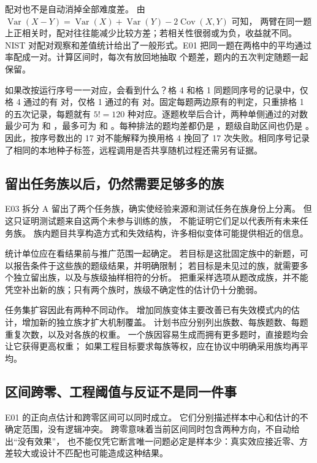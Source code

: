 配对也不是自动消掉全部难度差。
由 $\operatorname{Var}(X-Y)=\operatorname{Var}(X)+\operatorname{Var}(Y)-2\operatorname{Cov}(X,Y)$ 可知，
两臂在同一题上正相关时，配对往往能减少比较方差；若相关性很弱或为负，收益就不同。
NIST 对配对观察和差值统计给出了一般形式\cite{nist-paired}。E01 把同一题在两格中的平均通过率配成一对。计算区间时，每次有放回地抽取  个题差，题内的五次判定随题一起保留。

如果改按运行序号一一对应，会看到什么？格 4 和格 1 同题同序号的记录中，仅格 4 通过的有  对，仅格 1 通过的有  对。固定每题两边原有的判定，只重排格 1 的五次记录，每题就有 $5!=120$ 种对应。逐题枚举后合计，两种单侧通过的对数最少可为  和 ，最多可为  和 。每种排法的题均差都仍是 ，题级自助区间也仍是 \measured{$[-0.1000,+0.1750]$}。因此，按序号数出的 17 对不能解释为换用格 4 挽回了 17 次失败。相同序号记录了相同的本地种子标签，远程调用是否共享随机过程还需另有证据。

\subsection{留出任务族以后，仍然需要足够多的族}

E03 拆分 A 留出了两个任务族，确实使经验来源和测试任务在族身份上分离。
但这只证明测试题来自这两个未参与训练的族，
不能证明它们足以代表所有未来任务族。
族内题目共享构造方式和失效结构，许多相似变体可能提供相近的信息。

统计单位应在看结果前与推广范围一起确定。
若目标是这批固定族中的新题，可以报告条件于这些族的题级结果，并明确限制；
若目标是未见过的族，就需要多个独立留出族，以及与族级抽样相符的分析。
把重采样选项从题改成族，并不能凭空补出新的族；只有两个族时，族级不确定性的估计仍十分脆弱。

任务集扩容因此有两种不同动作。
增加同族变体主要改善已有失效模式内的估计，增加新的独立族才扩大机制覆盖。
计划书应分别列出族数、每族题数、每题重复次数，以及对各族的权重。
一个族因容易生成而拥有更多题时，直接题均会让它获得更高权重；
如果工程目标要求每族等权，应在协议中明确采用族均再平均。

\subsection{区间跨零、工程阈值与反证不是同一件事}

E01 的正向点估计和跨零区间可以同时成立。
它们分别描述样本中心和估计的不确定范围，没有逻辑冲突。
跨零意味着当前区间同时包含两种方向，不自动给出“没有效果”，
也不能仅凭它断言唯一问题必定是样本少：真实效应接近零、方差较大或设计不匹配也可能造成这种结果。

